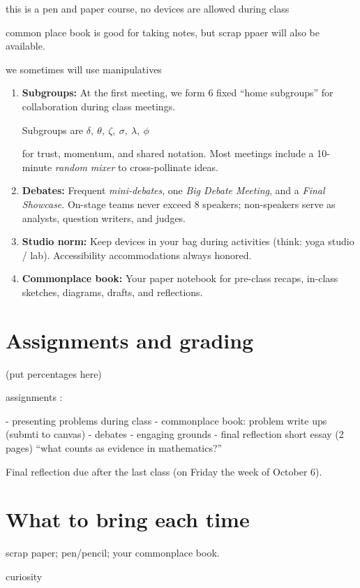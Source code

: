 \documentclass[oneside,11pt]{amsart}
\begin{document}
this is a pen and paper course, no devices are allowed during class


common place book is good for taking notes, but scrap ppaer will also be available. 

we sometimes will use manipulatives


\begin{enumerate}[$\bullet$]
  \item \textbf{Subgroups:} At the first meeting, we form 6 fixed ``home subgroups'' 
	for collaboration during class meetings. 

	Subgroups are
	$\delta, \ \theta, \ \zeta, \ \sigma, \ \lambda, \ \phi$

	for trust, momentum, and shared notation. Most meetings include a 10-minute \emph{random mixer} to cross-pollinate ideas.
  \item \textbf{Debates:} Frequent \emph{mini-debates}, one \emph{Big Debate Meeting}, and a \emph{Final Showcase}. On-stage teams never exceed 8 speakers; non-speakers serve as analysts, question writers, and judges.

  \item \textbf{Studio norm:} Keep devices in your bag during activities (think: yoga studio / lab). Accessibility accommodations always honored.
  \item \textbf{Commonplace book:} Your paper notebook for pre-class recaps, in-class sketches, diagrams, drafts, and reflections.
\end{enumerate}


\section{Assignments and grading}

(put percentages here)

assignments :

- presenting problems during class
- commonplace book: problem write ups (submti to canvas)
- debates
- engaging grounds
- final reflection short essay (2 pages) ``what counts as evidence in mathematics?''

Final reflection due after the last class (on Friday the week of October 6).

\section{What to bring each time}
scrap paper; pen/pencil; your commonplace book.

curiosity
\end{document}
